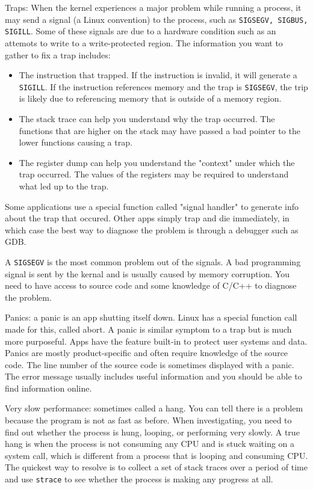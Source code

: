 \documentclass[11pt]{article}
\begin{document}
\begin{enumerate}
\noindent Traps: When the kernel experiences a major problem while running a process, it may send a signal (a Linux convention) to the process, such as \texttt{SIGSEGV, SIGBUS, SIGILL}. Some of these signals are due to a hardware condition such as an attemots to write to a write-protected region. The information you want to gather to fix a trap includes:
\begin{itemize}
    \item The instruction that trapped. If the instruction is invalid, it will generate a \texttt{SIGILL}. If the instruction references memory and the trap is \texttt{SIGSEGV}, the trip is likely due to referencing memory that is outside of a memory region.
    \item The stack trace can help you understand why the trap occurred. The functions that are higher on the stack may have passed a bad pointer to the lower functions causing a trap.
    \item The register dump can help you understand the "context" under which the trap occurred. The values of the registers may be required to understand what led up to the trap.
\end{itemize}

\noindent Some applications use a special function called "signal handler" to generate info about the trap that occured. Other apps simply trap and die immediately, in which case the best way to diagnose the problem is through a debugger such as GDB.

\noindent A \texttt{SIGSEGV} is the most common problem out of the signals. A bad programming signal is sent by the kernal and is usually caused by memory corruption. You need to have access to source code and some knowledge of C/C++ to diagnose the problem.

\noindent Panics: a panic is an app shutting itself down. Linux has a special function call made for this, called abort. A panic is similar symptom to a trap but is much more purposeful. Apps have the feature built-in to protect user systems and data. Panics are mostly product-specific and often require knowledge of the source code. The line number of the source code is sometimes displayed with a panic. The error message usually includes useful information and you should be able to find information online.

\noindent Very slow performance: sometimes called a hang. You can tell there is a problem because the program is not as fast as before. When investigating, you need to find out whether the process is hung, looping, or performing very slowly. A true hang is when the process is not consuming any CPU and is stuck waiting on a system call, which is different from a process that is looping and consuming CPU. The quickest way to resolve is to collect a set of stack traces over a period of time and use \texttt{strace} to see whether the process is making any progress at all. 


\end{enumerate}
\end{document}
